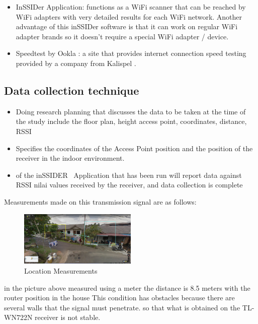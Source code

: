 \documentclass[conference]{IEEEtran}
\begin{document}
\begin{itemize}
    \item InSSIDer Application: functions as a WiFi scanner that can be reached by WiFi adapters with very detailed results for each WiFi network. Another advantage of this inSSIDer software is that it can work on regular WiFi adapter brands so it doesn't require a special WiFi adapter / device. ~\cite{Meta}
    \item Speedtest by Ookla : a site that provides internet connection speed testing provided by a company from Kalispel .
\end{itemize}

\subsection{Data collection technique}

\begin{itemize}
    \item Doing research planning that discusses the data to be taken
at the time of the study include the floor plan, height
access point, coordinates, distance, RSSI

    \item Specifies the coordinates of the Access Point position
and the position of the receiver in the indoor environment.

    \item of the inSSIDER \ Application that has been run
will report data against RSSI nilai values
received by the receiver, and
data collection is complete
\end{itemize}


Measurements made on this transmission signal are as follows:

\begin{figure}[h]
    \centering
    \includegraphics[width=0.5\textwidth]{gambar-lokasi.png}
    \caption{Location Measurements}
\end{figure}

in the picture above measured using a meter the distance is 8.5 meters with the router position in the house
This condition has obstacles because there are several walls that the signal must penetrate. so that what is obtained on the TL-WN722N receiver is not stable.
\end{document}
